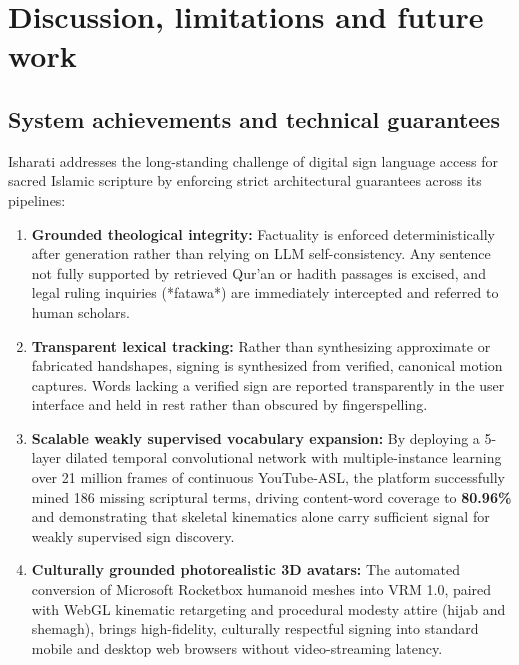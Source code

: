 \chapter{Discussion, limitations and future work}
\label{sec:discussion}

\section{System achievements and technical guarantees}
Isharati addresses the long-standing challenge of digital sign language access for sacred Islamic scripture by enforcing strict architectural guarantees across its pipelines:
\begin{enumerate}[leftmargin=*,itemsep=2pt]
  \item \textbf{Grounded theological integrity:} Factuality is enforced deterministically after generation rather than relying on LLM self-consistency. Any sentence not fully supported by retrieved Qur'an or hadith passages is excised, and legal ruling inquiries (*fatawa*) are immediately intercepted and referred to human scholars.
  \item \textbf{Transparent lexical tracking:} Rather than synthesizing approximate or fabricated handshapes, signing is synthesized from verified, canonical motion captures. Words lacking a verified sign are reported transparently in the user interface and held in rest rather than obscured by fingerspelling.
  \item \textbf{Scalable weakly supervised vocabulary expansion:} By deploying a 5-layer dilated temporal convolutional network with multiple-instance learning over 21 million frames of continuous YouTube-ASL, the platform successfully mined 186 missing scriptural terms, driving content-word coverage to \textbf{80.96\%} and demonstrating that skeletal kinematics alone carry sufficient signal for weakly supervised sign discovery.
  \item \textbf{Culturally grounded photorealistic 3D avatars:} The automated conversion of Microsoft Rocketbox humanoid meshes into VRM 1.0, paired with WebGL kinematic retargeting and procedural modesty attire (hijab and shemagh), brings high-fidelity, culturally respectful signing into standard mobile and desktop web browsers without video-streaming latency.
\end{enumerate}

